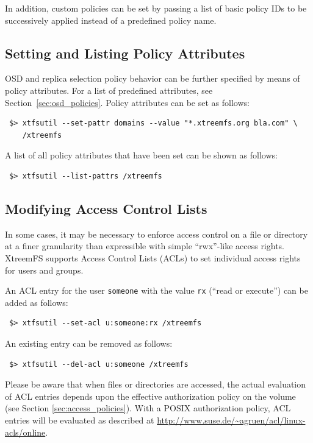 \documentclass[a4paper,10pt]{book}
\begin{document}
In addition, custom policies can be set by passing a list of basic policy IDs to be successively applied instead of a predefined policy name.


\subsection{Setting and Listing Policy Attributes}

OSD and replica selection policy behavior can be further specified by means of policy attributes. For a list of predefined attributes, see Section~\ref{sec:osd_policies}. Policy attributes can be set as follows:

\begin{verbatim}
 $> xtfsutil --set-pattr domains --value "*.xtreemfs.org bla.com" \
    /xtreemfs
\end{verbatim}

A list of all policy attributes that have been set can be shown as follows:

\begin{verbatim}
 $> xtfsutil --list-pattrs /xtreemfs
\end{verbatim}

\subsection{Modifying Access Control Lists}

In some cases, it may be necessary to enforce access control on a file or directory at a finer granularity than expressible with simple ``rwx''-like access rights. XtreemFS supports Access Control Lists (ACLs) to set individual access rights for users and groups.

An ACL entry for the user \texttt{someone} with the value \texttt{rx} (``read or execute'') can be added as follows:

\begin{verbatim}
 $> xtfsutil --set-acl u:someone:rx /xtreemfs
\end{verbatim}

An existing entry can be removed as follows:

\begin{verbatim}
 $> xtfsutil --del-acl u:someone /xtreemfs
\end{verbatim}

Please be aware that when files or directories are accessed, the actual evaluation of ACL entries depends upon the effective authorization policy on the volume (see Section \ref{sec:access_policies}). With a POSIX authorization policy, ACL entries will be evaluated as described at \href{http://www.suse.de/~agruen/acl/linux-acls/online}{http://www.suse.de/\~{}agruen/acl/linux-acls/online}.
\end{document}
